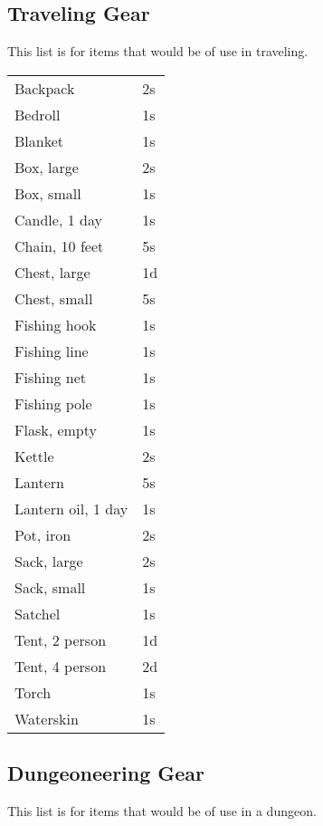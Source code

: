 \subsection{Traveling Gear}

This list is for items that would be of use in traveling.

\begin{center}
{
\begin{xtabular}{|l|l|}
Backpack & 2s \\
Bedroll & 1s \\
Blanket & 1s \\
Box, large & 2s \\
Box, small & 1s \\
Candle, 1 day & 1s \\
Chain, 10 feet & 5s \\
Chest, large & 1d \\
Chest, small & 5s \\
Fishing hook & 1s \\
Fishing line & 1s \\
Fishing net & 1s \\
Fishing pole & 1s \\
Flask, empty & 1s \\
Kettle & 2s \\
Lantern & 5s \\
Lantern oil, 1 day & 1s \\
Pot, iron & 2s \\
Sack, large & 2s \\
Sack, small & 1s \\
Satchel & 1s \\
Tent, 2 person & 1d \\
Tent, 4 person & 2d \\
Torch & 1s \\
Waterskin & 1s \\
\hline
\end{xtabular}
}
\end{center}

\subsection{Dungeoneering Gear}

This list is for items that would be of use in a dungeon.

